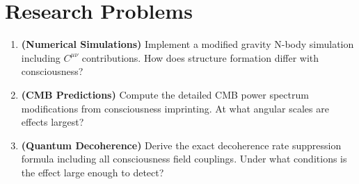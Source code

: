 \section*{Research Problems}

\begin{enumerate}
\item \textbf{(Numerical Simulations)} Implement a modified gravity N-body simulation including $C^{\mu\nu}$ contributions. How does structure formation differ with consciousness?

\item \textbf{(CMB Predictions)} Compute the detailed CMB power spectrum modifications from consciousness imprinting. At what angular scales are effects largest?

\item \textbf{(Quantum Decoherence)} Derive the exact decoherence rate suppression formula including all consciousness field couplings. Under what conditions is the effect large enough to detect?
\end{enumerate}

